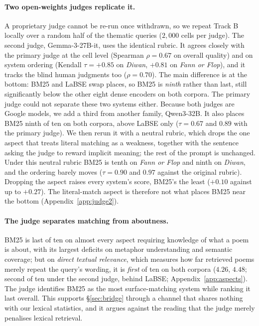 \paragraph{Two open-weights judges replicate it.} A proprietary judge cannot be re-run once
withdrawn, so we repeat Track B locally over a random half of the thematic queries ($2{,}000$ cells
per judge). The second judge, Gemma-3-27B-it, uses the identical rubric. It agrees closely with the primary
judge at the cell level (Spearman $\rho{=}0.67$ on overall quality) and on system ordering (Kendall
$\tau{=}{+}0.85$ on \textit{Diwan}, ${+}0.81$ on \textit{Fann or Flop}), and it tracks the blind
human judgments too ($\rho{=}0.70$). The main difference is at the bottom: BM25 and LaBSE swap
places, so BM25 is \emph{ninth} rather than last, still significantly below the other eight dense
encoders on both corpora. The primary judge could not separate these two systems either. Because
both judges are Google models, we add a third from another family, Qwen3-32B. It also places BM25
ninth of ten on both corpora, above LaBSE only ($\tau{=}0.67$ and $0.89$ with the primary judge).
We then rerun it with a neutral rubric, which drops the one aspect that treats literal matching as a
weakness, together with the sentence asking the judge to reward implicit meaning; the rest of the
prompt is unchanged. Under this neutral rubric BM25 is tenth on \textit{Fann or Flop} and ninth on \textit{Diwan}, and the ordering
barely moves ($\tau{=}0.90$ and $0.97$ against the original rubric). Dropping the aspect raises
every system's score, BM25's the least ($+0.10$ against up to $+0.27$). The literal-match aspect is
therefore not what places BM25 near the bottom (Appendix~\ref{app:judge2}).

\paragraph{The judge separates matching from aboutness.} BM25 is last of ten on almost every aspect
requiring knowledge of what a poem is about, with its largest deficits on metaphor understanding and
semantic coverage; but on \emph{direct textual relevance}, which measures how far retrieved poems
merely repeat the query's wording, it is \emph{first} of ten on both corpora ($4.26$, $4.48$;
second of ten under the second judge, behind LaBSE; Appendix~\ref{app:aspects}). The judge
identifies BM25 as the most surface-matching system while ranking it last overall. This supports
\S\ref{sec:bridge} through a channel that shares nothing with our lexical statistics, and it argues
against the reading that the judge merely penalises lexical retrieval.

\begin{table}[t]
\centering\small
\setlength{\tabcolsep}{3.5pt}

\caption{Track A (known-item Recall@5) beside Track B (thematic judge score, 1 to 5), verse mode,
$n{=}200$ queries per cell with no judge failures. The lower block gives the first rater's blind
human relevance of the top-3 (0 to 2) for the three annotated systems.}
\label{tab:trackb}
\end{table}
